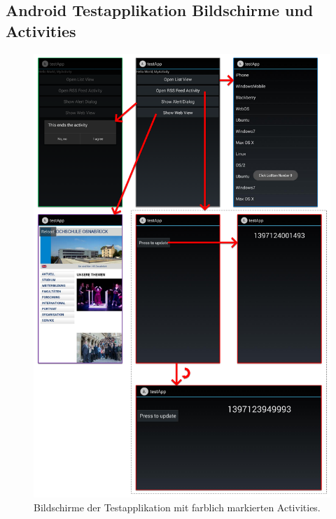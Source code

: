 \subsection{Android Testapplikation Bildschirme und Activities \label{anhang:test_app_screens}}
\begin{figure}[htb]
	\centering
	\includegraphics[width=0.7\linewidth]{img/client_test_app_screens}
	\caption{Bildschirme der Testapplikation mit farblich markierten Activities. \label{fig:client_test_app_screens}}
\end{figure}
